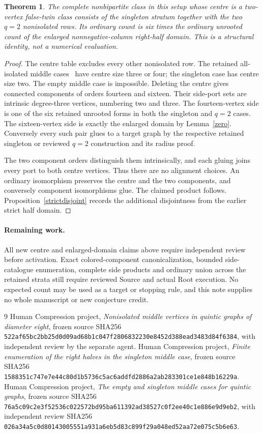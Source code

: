 \documentclass[11pt]{article}
\newtheorem{theorem}{Theorem}
\begin{document}
\begin{theorem}\label{twocentre}
The complete nonbipartite class in this setup whose centre is a two-vertex false-twin
class consists of the singleton stratum together with the two $q=2$
nonisolated rows. Its ordinary count is six times the ordinary unrooted
count of the enlarged nonnegative-column right-half domain. This is a
structural identity, not a numerical evaluation.
\end{theorem}
\begin{proof}
The centre table excludes every other nonisolated row. The retained
all-isolated middle cases~\cite{singleton} have centre size three or four; the singleton
case has centre size two. The empty middle case is impossible.
Deleting the centre gives connected components of orders fourteen and
sixteen. Their side-port sets are intrinsic degree-three vertices,
numbering two and three. The fourteen-vertex side is one of the six
retained unrooted forms in both the singleton and $q=2$ cases.
The sixteen-vertex side is exactly the enlarged domain by Lemma~\ref{zero}.
Conversely every such pair glues to a target graph by the respective
retained singleton or reviewed $q=2$ construction and its radius proof.

The two component orders distinguish them intrinsically, and each
gluing joins every port to both centre vertices. Thus there are no
alignment choices. An ordinary isomorphism preserves the centre and
the two components, and conversely component isomorphisms glue. The
claimed product follows. Proposition~\ref{strictdisjoint} records the
additional disjointness from the earlier strict half domain.
\end{proof}

\paragraph{Remaining work.}
All new centre and enlarged-domain claims above require independent
review before activation. Exact colored-component canonicalization,
bounded side-catalogue enumeration, complete side products and ordinary
union across the retained strata still require reviewed Source and actual
Root execution. No expected count may be used as a target or stopping
rule, and this note supplies no whole manuscript or new conjecture credit.

\begin{thebibliography}{9}
 Human Compression project, \emph{Nonisolated middle vertices
in quintic graphs of diameter eight}, frozen source SHA256
\texttt{522af65bc2bb25d0d09ad68b1c047f2806832230e8452d388ead3483d84f6384},
with independent review by the separate agent.
 Human Compression project, \emph{Finite enumeration of the
right halves in the singleton middle case}, frozen source SHA256
\texttt{1588351c747e7e44c80d1b5736c5ac6addfd2886a2ab283301ce1e848b16229a}.
 Human Compression project,
\emph{The empty and singleton middle cases for quintic graphs}, frozen
source SHA256
\texttt{76a5c09c2e3f52536c022572bd95ba611392ad38527c0f2ee40c1e886e9d9eb2},
with independent review SHA256
\texttt{026a34a5c0d80143005551a931a6eb5d83c899f29a048ed52aa72e075c5b6e63}.
\end{thebibliography}
\end{document}
